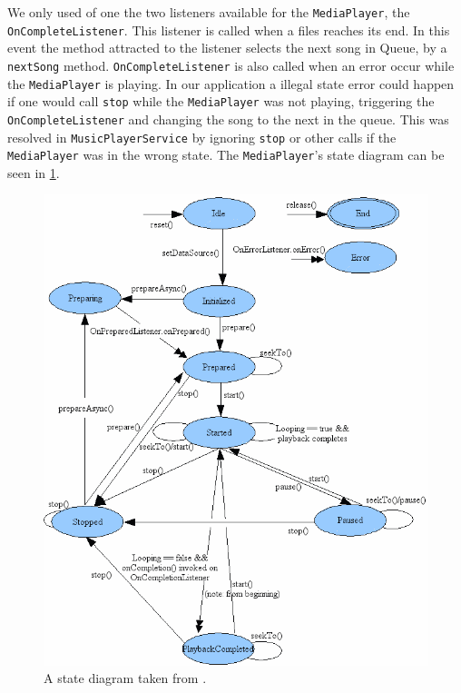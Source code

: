 We only used of one the two listeners available for the \texttt{MediaPlayer}, the \texttt{OnCompleteListener}. This listener is called when a files reaches its end. In this event the method attracted to the listener selects the next song in Queue, by a \texttt{nextSong} method. \texttt{OnCompleteListener} is also called when an error occur while the \texttt{MediaPlayer} is playing. In our application a illegal state error could happen if one would call \texttt{stop} while the \texttt{MediaPlayer} was not playing, triggering the \texttt{OnCompleteListener} and changing the song to the next in the queue. This was resolved in \texttt{MusicPlayerService} by ignoring \texttt{stop} or other calls if the \texttt{MediaPlayer} was in the wrong state. The \texttt{MediaPlayer}'s state diagram can be seen in \cref{fig:medaiPlayerState}.

\begin{figure}[h!]
  \centering
    \includegraphics[scale=.33]{Images/mediaplayerStateDiagram.png}
  \caption{A state diagram taken from \citet{android:MediaPlayer}.}
  \label{fig:medaiPlayerState}
\end{figure}
